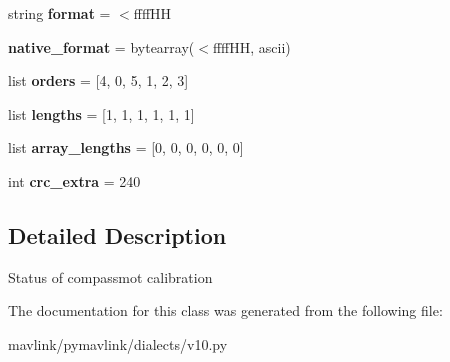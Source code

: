 \begin{DoxyCompactItemize}
string {\bfseries format} = \textquotesingle{}$<$ffff\+HH\textquotesingle{}
\item 
\mbox{\label{classpymavlink_1_1dialects_1_1v10_1_1MAVLink__compassmot__status__message_a6e2e0000c1790c54ec8e58a0ebd4ce56}} 
{\bfseries native\+\_\+format} = bytearray(\textquotesingle{}$<$ffff\+HH\textquotesingle{}, \textquotesingle{}ascii\textquotesingle{})
\item 
\mbox{\label{classpymavlink_1_1dialects_1_1v10_1_1MAVLink__compassmot__status__message_a7ab29bcf67ee0a329fad26c7c981c88d}} 
list {\bfseries orders} = \mbox{[}4, 0, 5, 1, 2, 3\mbox{]}
\item 
\mbox{\label{classpymavlink_1_1dialects_1_1v10_1_1MAVLink__compassmot__status__message_a4affdc3d8338ecdd52380fc48b40d2e9}} 
list {\bfseries lengths} = \mbox{[}1, 1, 1, 1, 1, 1\mbox{]}
\item 
\mbox{\label{classpymavlink_1_1dialects_1_1v10_1_1MAVLink__compassmot__status__message_a249b7c61039422fadcb79cf9ec5b4a5f}} 
list {\bfseries array\+\_\+lengths} = \mbox{[}0, 0, 0, 0, 0, 0\mbox{]}
\item 
\mbox{\label{classpymavlink_1_1dialects_1_1v10_1_1MAVLink__compassmot__status__message_ad15b5ce75ff463d648b5e08fa6510dfc}} 
int {\bfseries crc\+\_\+extra} = 240
\end{DoxyCompactItemize}


\subsection{Detailed Description}
\begin{DoxyVerb}Status of compassmot calibration
\end{DoxyVerb}
 

The documentation for this class was generated from the following file\+:\begin{DoxyCompactItemize}
\item 
mavlink/pymavlink/dialects/v10.\+py\end{DoxyCompactItemize}
